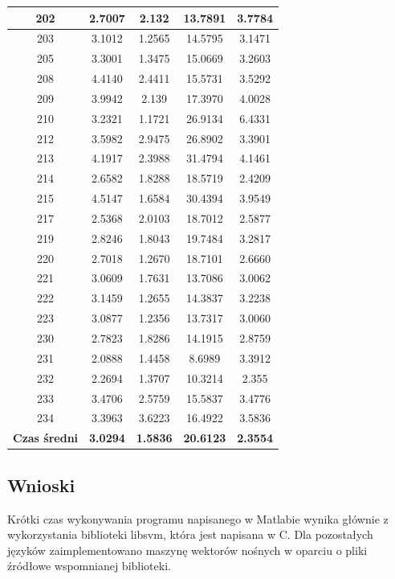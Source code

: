 \begin{table}[!tp]
\begin{tabular}{|c|c|c|c|c|}
		202 & 2.7007 & 2.132  & 13.7891 & 3.7784\\ \hline
		203 & 3.1012 & 1.2565 & 14.5795 & 3.1471\\ \hline
		205 & 3.3001 & 1.3475 & 15.0669 & 3.2603\\ \hline
		208 & 4.4140 & 2.4411 & 15.5731 & 3.5292\\ \hline
		209 & 3.9942 & 2.139  & 17.3970 & 4.0028\\ \hline	
		210 & 3.2321 & 1.1721 & 26.9134 & 6.4331\\ \hline
		212 & 3.5982 & 2.9475 & 26.8902 & 3.3901\\ \hline
		213 & 4.1917 & 2.3988 & 31.4794 & 4.1461\\ \hline
		214 & 2.6582 & 1.8288 & 18.5719 & 2.4209\\ \hline
		215 & 4.5147 & 1.6584 & 30.4394 & 3.9549\\ \hline
		217 & 2.5368 & 2.0103 & 18.7012 & 2.5877\\ \hline
		219 & 2.8246 & 1.8043 & 19.7484 & 3.2817\\ \hline
		220 & 2.7018 & 1.2670 & 18.7101 & 2.6660\\ \hline		
		221 & 3.0609 & 1.7631 & 13.7086 & 3.0062\\ \hline
		222 & 3.1459 & 1.2655 & 14.3837 & 3.2238\\ \hline
		223 & 3.0877 & 1.2356 & 13.7317 & 3.0060\\ \hline
		230 & 2.7823 & 1.8286 & 14.1915 & 2.8759\\ \hline
		231 & 2.0888 & 1.4458 &  8.6989 & 3.3912\\ \hline
		232 & 2.2694 & 1.3707 & 10.3214  & 2.355\\ \hline
		233 & 3.4706 & 2.5759 & 15.5837 & 3.4776\\ \hline
		234 & 3.3963 & 3.6223 & 16.4922 & 3.5836\\ \hline
		\textbf{Czas średni} & \textbf{3.0294} & \textbf{1.5836} & \textbf{20.6123} & \textbf{2.3554}\\ \hline
	\end{tabular}
\end{table}

\subsection{Wnioski}
\label{sub:wnioski}

\qquad Krótki czas wykonywania programu napisanego w Matlabie wynika głównie z wykorzystania biblioteki libsvm, która jest napisana w C. Dla pozostałych języków zaimplementowano maszynę wektorów nośnych w oparciu o pliki źródłowe wspomnianej biblioteki.

